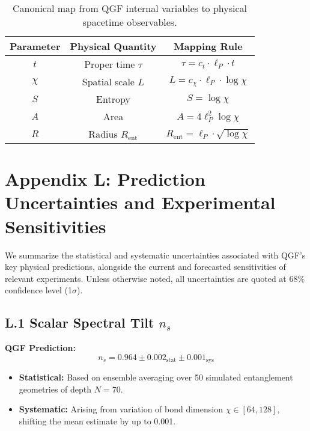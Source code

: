 \documentclass[11pt]{article}
\begin{document}
\begin{table}[H]
\centering
\renewcommand{\arraystretch}{1.2}
\begin{tabular}{|c|c|c|}
\hline
\textbf{Parameter} & \textbf{Physical Quantity} & \textbf{Mapping Rule} \\
\hline
\( t \) & Proper time \( \tau \) & \( \tau = c_t \cdot \ell_P \cdot t \) \\
\( \chi \) & Spatial scale \( L \) & \( L = c_\chi \cdot \ell_P \cdot \log \chi \) \\
\( S \) & Entropy & \( S = \log \chi \) \\
\( A \) & Area & \( A = 4 \ell_P^2 \log \chi \) \\
\( R \) & Radius \( R_{\text{ent}} \) & \( R_{\text{ent}} = \ell_P \cdot \sqrt{\log \chi} \) \\
\hline
\end{tabular}
\caption{Canonical map from QGF internal variables to physical spacetime observables.}
\label{tab:modular-map}
\end{table}

\section*{Appendix L: Prediction Uncertainties and Experimental Sensitivities}

We summarize the statistical and systematic uncertainties associated with QGF’s key physical predictions, alongside the current and forecasted sensitivities of relevant experiments. Unless otherwise noted, all uncertainties are quoted at 68\% confidence level (1$\sigma$).

\subsection*{L.1 Scalar Spectral Tilt \( n_s \)}

\textbf{QGF Prediction:}
\[
n_s = 0.964 \pm 0.002_{\mathrm{stat}} \pm 0.001_{\mathrm{sys}}
\]

\begin{itemize}
\item \textbf{Statistical:} Based on ensemble averaging over 50 simulated entanglement geometries of depth \( N = 70 \).
\item \textbf{Systematic:} Arising from variation of bond dimension \( \chi \in [64, 128] \), shifting the mean estimate by up to 0.001.
\end{itemize}
\end{document}
